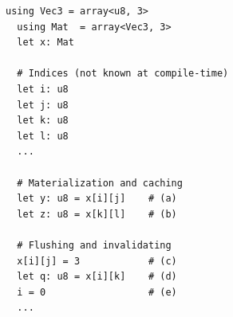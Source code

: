 \vspace{0.5cm}\noindent\begin{minipage}{\textwidth}
\begin{lstlisting}[style=pseudocode]
  using Vec3 = array<u8, 3>
  using Mat  = array<Vec3, 3>
  let x: Mat

  # Indices (not known at compile-time)
  let i: u8
  let j: u8
  let k: u8
  let l: u8
  ...

  # Materialization and caching
  let y: u8 = x[i][j]    # (a)
  let z: u8 = x[k][l]    # (b)

  # Flushing and invalidating
  x[i][j] = 3            # (c)
  let q: u8 = x[i][k]    # (d)
  i = 0                  # (e)
  ...
\end{lstlisting}
\end{minipage}


